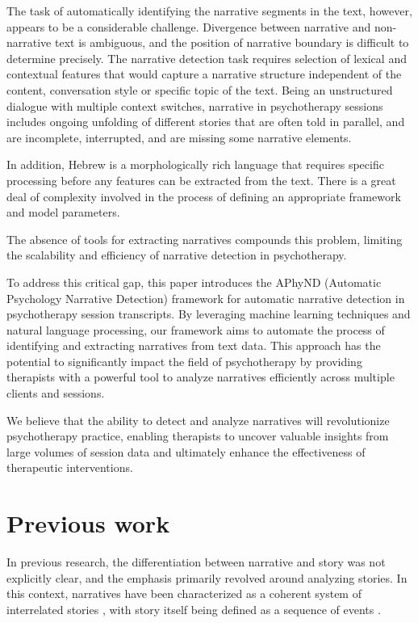 \documentclass[preprint,12pt]{elsarticle}
\begin{document}
The task of automatically identifying the narrative segments in the text, however, appears to be a considerable challenge. Divergence between narrative and non-narrative text is ambiguous, and the position of narrative boundary is difficult to determine precisely. The narrative detection task requires selection of lexical and contextual features that would capture a narrative structure independent of the content, conversation style or specific topic of the text. Being an unstructured dialogue with multiple context switches, narrative in psychotherapy sessions includes ongoing unfolding of different stories that are often told in parallel, and are incomplete, interrupted, and are missing some narrative elements.

In addition, Hebrew is a morphologically rich language that requires specific processing before any features can be extracted from the text. There is a great deal of complexity involved in the process of defining an appropriate framework and model parameters.

The absence of tools for extracting narratives compounds this problem, limiting the scalability and efficiency of narrative detection in psychotherapy.

To address this critical gap, this paper introduces the APhyND (Automatic Psychology Narrative Detection) framework for automatic narrative detection in psychotherapy session transcripts. By leveraging machine learning techniques and natural language processing, our framework aims to automate the process of identifying and extracting narratives from text data. This approach has the potential to significantly impact the field of psychotherapy by providing therapists with a powerful tool to analyze narratives efficiently across multiple clients and sessions.

We believe that the ability to detect and analyze narratives will revolutionize psychotherapy practice, enabling therapists to uncover valuable insights from large volumes of session data and ultimately enhance the effectiveness of therapeutic interventions.

\section{Previous work}
In previous research, the differentiation between narrative and story was not explicitly clear, and the emphasis primarily revolved around analyzing stories. In this context, narratives have been characterized as a coherent system of interrelated stories \cite{halverson2011master}, with story itself being defined as a sequence of events \cite{wake2013narrative}. 
\end{document}
